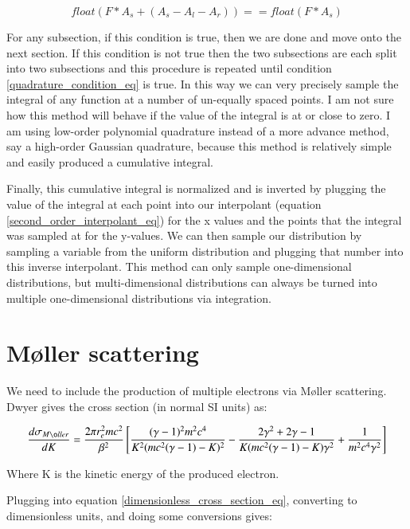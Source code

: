 \documentclass[]{article}
\begin{document}
\begin{equation}
\label{quadrature_condition_eq}
float(F*A_s + (A_s - A_l - A_r)) == float(F*A_s)
\end{equation}

For any subsection, if this condition is true, then we are done and move onto the next section. If this condition is not true then the two subsections are each split into two subsections and this procedure is repeated until condition \ref{quadrature_condition_eq} is true. In this way we can very precisely sample the integral of any function at a number of un-equally spaced points. I am not sure how this method will behave if the value of the integral is at or close to zero. I am using low-order polynomial quadrature instead of a more advance method, say a high-order Gaussian quadrature, because this method is relatively simple and easily produced a cumulative integral.

Finally, this cumulative integral is normalized and is inverted by plugging the value of the integral at each point into our interpolant (equation \ref{second_order_interpolant_eq}) for the x values and the points that the integral was sampled at for the y-values. We can then sample our distribution by sampling a variable from the uniform distribution and plugging that number into this inverse interpolant. This method can only sample one-dimensional distributions, but multi-dimensional distributions can always be turned into multiple one-dimensional distributions via integration.

\section{M\o ller scattering}

We need to include the production of multiple electrons via M\o ller scattering. Dwyer gives the cross section (in normal SI units) as:

\begin{equation} 
\frac{d\sigma_{M\o ller}}{d K} = \frac{2\pi r_e^2 m c^2}{\beta^2}\left[  \frac{(\gamma-1)^2m^2c^4}{K^2(mc^2(\gamma-1)-K)^2} - \frac{2\gamma^2 + 2\gamma -1}{K(mc^2(\gamma-1)-K)\gamma^2}  + \frac{1}{m^2c^4\gamma^2}  \right]
\end{equation}

Where K is the kinetic energy of the produced electron.

Plugging into equation \ref{dimensionless_cross_section_eq}, converting to dimensionless units, and doing some conversions gives:
\end{document}
